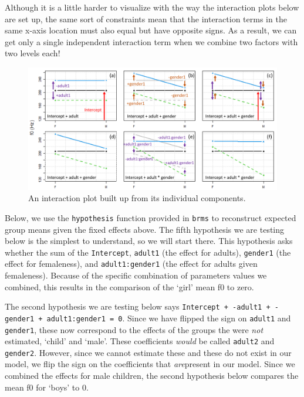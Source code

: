 \documentclass[
]{book}
\begin{document}
Although it is a little harder to visualize with the way the interaction plots below are set up, the same sort of constraints mean that the interaction terms in the same x-axis location must also equal but have opposite signs. As a result, we can get only a single independent interaction term when we combine two factors with two levels each!

\begin{figure}
\includegraphics[width=1\linewidth]{./images/interactionplot} \caption{An interaction plot built up from its individual components.}\label{fig:F4-interactionfig}
\end{figure}

Below, we use the \texttt{hypothesis} function provided in \texttt{brms} to reconstruct expected group means given the fixed effects above. The fifth hypothesis we are testing below is the simplest to understand, so we will start there. This hypothesis asks whether the sum of the \texttt{Intercept}, \texttt{adult1} (the effect for adults), \texttt{gender1} (the effect for femaleness), and \texttt{adult1:gender1} (the effect for adults given femaleness). Because of the specific combination of parameters values we combined, this results in the comparison of the `girl' mean f0 to zero.

The second hypothesis we are testing below says \texttt{Intercept\ +\ -adult1\ +\ -gender1\ +\ adult1:gender1\ =\ 0}. Since we have flipped the sign on \texttt{adult1} and \texttt{gender1}, these now correspond to the effects of the groups the were \emph{not} estimated, `child' and `male'. These coefficients \emph{would} be called \texttt{adult2} and \texttt{gender2}. However, since we cannot estimate these and these do not exist in our model, we flip the sign on the coefficients that \emph{are}present in our model. Since we combined the effects for male children, the second hypothesis below compares the mean f0 for `boys' to 0.
\end{document}
